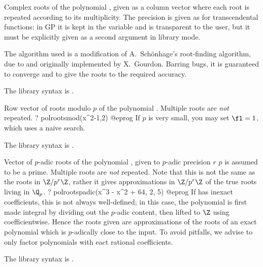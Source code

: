 \label{se:polroots}
Complex roots of the polynomial
, given as a column vector where each root is repeated according to
its multiplicity. The precision is given as for transcendental functions: in
GP it is kept in the variable  and is transparent to the
user, but it must be explicitly given as a second argument in library mode.

The algorithm used is a modification of A.~Sch\"onhage's
root-finding algorithm, due to and originally implemented by X.~Gourdon.
Barring bugs, it is guaranteed to converge and to give the roots to the
required accuracy.

The library syntax is .

\label{se:polrootsmod}
Row vector of roots modulo $p$ of the polynomial .
Multiple roots are \emph{not} repeated.
\bprog
? polrootsmod(x^2-1,2)
@eprog\noindent
If $p$ is very small, you may set $\fl=1$, which uses a naive search.

The library syntax is .

\label{se:polrootspadic}
Vector of $p$-adic roots of the polynomial , given to
$p$-adic precision $r$ $p$ is assumed to be a prime. Multiple roots are
\emph{not} repeated. Note that this is not the same as the roots in
$\Z/p^r\Z$, rather it gives approximations in $\Z/p^r\Z$ of the true roots
living in $\Q_p$.
\bprog
? polrootspadic(x^3 - x^2 + 64, 2, 5)
@eprog
If  has inexact  coefficients, this is not always
well-defined; in this case, the polynomial is first made integral by dividing
out the $p$-adic content, then lifted
to $\Z$ using  coefficientwise. Hence the roots given are
approximations of the roots of an exact polynomial which is $p$-adically
close to the input. To avoid pitfalls, we advise to only factor polynomials
with eact rational coefficients.

The library syntax is .

